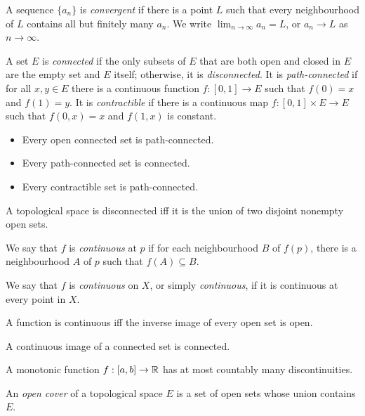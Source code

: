 \begin{defn}
  A sequence $\{a_n\}$ is \emph{convergent} if there is a point $L$ such that
  every neighbourhood of $L$ contains all but finitely many $a_n$.
  We write $\lim_{n\to\infty} a_n=L$, or $a_n\to L$ as $n\to\infty$.
\end{defn}
\begin{defn}
    A set $E$ is \emph{connected} if the only subsets of $E$ that are both open
    and closed in $E$ are the empty set and $E$ itself; otherwise, it is
    \emph{disconnected}. It is \emph{path-connected} if for all $x,y\in E$ there
    is a continuous function $f:[0,1]\to E$ such that $f(0)=x$ and $f(1)=y$.
    It is \emph{contractible} if there is a continuous map $f:[0,1]\times E\to E$
    such that $f(0,x)=x$ and $f(1,x)$ is constant.
\end{defn}
\begin{prop}
    \begin{itemize}
        \item Every open connected set is path-connected.
        \item Every path-connected set is connected.
        \item Every contractible set is path-connected.
    \end{itemize}
\end{prop}
\begin{prop}
    A topological space is disconnected iff it is the union of two 
    disjoint nonempty open sets.
\end{prop}
\begin{defn}
  We say that $f$ is \emph{continuous} at $p$ if for each neighbourhood $B$ of
  $f(p)$, there is a neighbourhood $A$ of $p$ such that $f(A)\subseteq B$.

  We say that $f$ is \emph{continuous} on $X$, or simply \emph{continuous},
  if it is continuous at every point in $X$.
\end{defn}
\begin{prop}
  A function is continuous iff the inverse image of every open set is open.
\end{prop}
\begin{prop}
    A continuous image of a connected set is connected.
\end{prop}
\begin{prop}
    A monotonic function $f:[a,b]\to\mathbb{R}$ has at most countably many
    discontinuities.
\end{prop}
\begin{defn}
  An \emph{open cover} of a topological space $E$ is a set of open sets whose union contains $E$.
\end{defn}
